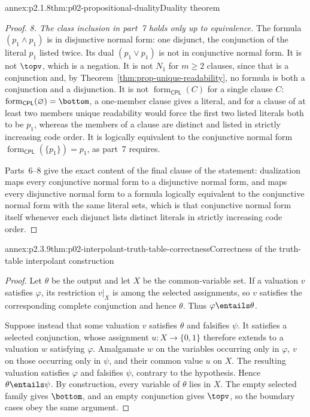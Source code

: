 \begin{annexitem}{annex:p2.1.8}{thm:p02-propositional-duality}{Duality theorem}
\begin{proof}
\emph{8. The class inclusion in part~7 holds only up to equivalence.}  The
formula \((p_1\land p_1)\) is in disjunctive normal form: one disjunct, the
conjunction of the literal \(p_1\) listed twice.  Its dual \((p_1\lor p_1)\)
is not in conjunctive normal form.  It is not \(\topv\), which is a negation.
It is not \(N_1\) for \(m\geq 2\) clauses, since that is a conjunction and, by
Theorem~\ref{thm:prop-unique-readability}, no formula is both a conjunction
and a disjunction.  It is not \(\operatorname{form}_{\mathsf{CPL}}(C)\) for a
single clause \(C\): \(\operatorname{form}_{\mathsf{CPL}}(\varnothing)=\bottom\),
a one-member clause gives a literal, and for a clause of at least two members
unique readability would force the first two listed literals both to be
\(p_1\), whereas the members of a clause are distinct and listed in strictly
increasing code order.  It is logically equivalent to the conjunctive normal
form \(\operatorname{form}_{\mathsf{CPL}}(\{p_1\})=p_1\), as part~7 requires.

Parts~6--8 give the exact content of the final clause of the statement:
dualization maps every conjunctive normal form to a disjunctive normal form,
and maps every disjunctive normal form to a formula logically equivalent to the
conjunctive normal form with the same literal sets, which is that conjunctive
normal form itself whenever each disjunct lists distinct literals in
strictly increasing code order.
\end{proof}
\end{annexitem}

\begin{annexitem}{annex:p2.3.9}{thm:p02-interpolant-truth-table-correctness}{Correctness of the truth-table interpolant construction}
\begin{proof}
Let \(\theta\) be the output and let \(X\) be the common-variable set.  If a
valuation \(v\) satisfies \(\varphi\), its restriction \(v|_X\) is among the
selected assignments, so \(v\) satisfies the corresponding complete
conjunction and hence \(\theta\).  Thus
\(\varphi\entails\theta\).

Suppose instead that some valuation \(v\) satisfies \(\theta\) and falsifies
\(\psi\).  It satisfies a selected conjunction, whose assignment
\(u:X\to\{0,1\}\) therefore extends to a valuation \(w\) satisfying
\(\varphi\).  Amalgamate \(w\) on the variables occurring only in
\(\varphi\), \(v\) on those occurring only in \(\psi\), and their common
value \(u\) on \(X\).  The resulting valuation satisfies \(\varphi\) and
falsifies \(\psi\), contrary to the hypothesis.  Hence
\(\theta\entails\psi\).  By construction, every variable of \(\theta\) lies
in \(X\).  The empty selected family gives \(\bottom\), and an empty
conjunction gives \(\topv\), so the boundary cases obey the same argument.
\end{proof}
\end{annexitem}

